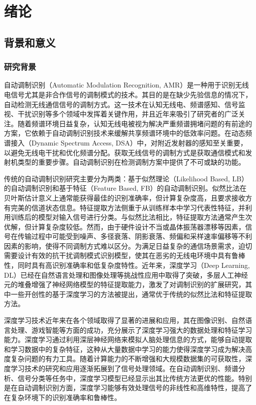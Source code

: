 \chapter{绪论}\label{chap:intro}

\section{背景和意义}\label{sec:background}

\subsection{研究背景}\label{sec:background}

自动调制识别（Automatic Modulation Recognition, AMR）是一种用于识别无线电信号尤其是非合作信号的调制模式的技术。其目的是在缺少先验信息的情况下，自动检测无线通信信号的调制方式。这一技术在认知无线电、频谱感知、信号监视、干扰识别等多个领域中发挥着关键作用，并且近年来吸引了研究者的广泛关注。随着频谱环境日益复杂，认知无线电被视为解决严重频谱拥堵问题的有前途的方案，它依赖于自动调制识别技术来缓解共享频谱环境中的低效率问题\cite{ghasemzadeh2022gs}。在动态频谱接入（Dynamic Spectrum Access, DSA）中，对附近发射器的感知至关重要，以避免无线电干扰和优化频谱分配。获取无线信号的调制方式是获取通信模式和发射机类型的重要步骤。自动调制识别在检测调制方案中提供了不可或缺的功能。

传统的自动调制识别研究主要分为两类：基于似然理论（Likelihood Based, LB）\cite{zhu2014phase}的自动调制识别和基于特征（Feature Based, FB）\cite{al2019performance}的自动调制识别。似然比法在贝叶斯估计意义上通常能获得最佳的识别准确率，但计算复杂度高，且要求接收方有完美的信道状态信息\cite{dulek2017online}\cite{wei2000maximum}\cite{xu2010likelihood}。特征提取方法侧重于从训练样本中学习代表性特征，并利用训练后的模型对输入信号进行分类\cite{hazza2013overview}。与似然比法相比，特征提取方法通常产生次优解，但计算复杂度较低。然而，由于硬件设计不当或晶体振荡器漂移等因素，信号在传输过程中可能受到噪声、多径衰落、阴影衰落、频偏和采样速率偏移等不利因素的影响，使得不同调制方式难以区分。为满足日益复杂的通信场景需求，迫切需要设计有效的抗干扰调制模式识别模型，使其在恶劣的无线电环境中具有鲁棒性，同时具有高识别准确率和低复杂度特性。近年来，深度学习（Deep Learning, DL）\cite{lecun2015deep}已经在自然语言处理和图像处理等挑战性应用中取得了突破，多层人工神经元的堆叠增强了神经网络模型的特征提取能力，激发了对调制识别的扩展研究，其中一些开创性的基于深度学习的方法被提出，通常优于传统的似然比法和特征提取方法。

深度学习技术近年来在各个领域取得了显著的进展和应用，其在图像识别、自然语言处理、游戏智能等方面的成功，充分展示了深度学习强大的数据处理和特征学习能力。深度学习通过利用深层神经网络来模拟人脑处理信息的方式，能够自动提取和学习数据中的复杂特征，这种从大量数据中学习的能力使得深度学习成为解决高度复杂问题的有力工具。随着计算能力的不断增强和大规模数据集的可获取性，深度学习技术的研究和应用逐渐拓展到了信号处理领域。在自动调制识别、频谱分析、信号分类等任务中，深度学习模型已经显示出其比传统方法更优的性能\cite{meng2018automatic}。特别是在自动调制识别方面，深度学习能够有效处理信号的非线性和高维特性，提高了在复杂环境下的识别准确率和鲁棒性。

